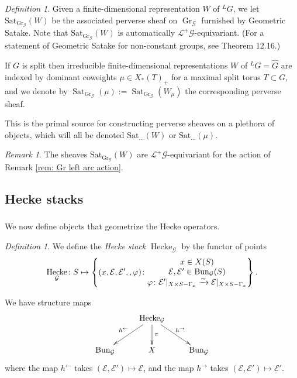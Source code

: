 \documentclass[reqno]{amsart}
\numberwithin{equation}{section}
\newcommand{\wh}[1]{\widehat{#1}}
\newcommand{\Cal}[1]{\mathcal{#1}}
\newcommand{\co}{\colon}
\newcommand{\mrm}[1]{\mathrm{#1}}
\DeclareMathOperator{\Bun}{Bun}
\DeclareMathOperator{\Gr}{Gr}
\DeclareMathOperator{\Hecke}{Hecke}
\DeclareMathOperator{\Sat}{Sat}
\theoremstyle{remark}
\newtheorem{remark}[thm]{Remark}
\newtheorem{defn}[thm]{Definition}
\numberwithin{equation}{section}
\begin{document}
\begin{defn}
Given a finite-dimensional representation $W$ of ${}^L G$, we let $\mrm{Sat}_{\Gr_{\Cal{G}}}(W)$ be the associated perverse sheaf on $\Gr_{\Cal{G}}$ furnished by Geometric Satake. Note that $\mrm{Sat}_{\Gr_{\Cal{G}}}(W)$ is automatically $\Cal{L}^+ \Cal{G}$-equivariant. (For a statement of Geometric Satake for non-constant groups, see \cite{Laff12} Theorem 12.16.) 

If $G$ is split then irreducible finite-dimensional representations $W$ of ${}^L  G   = \wh{G}$ are indexed by dominant coweights $\mu \in  X_*(T)_+$ for a maximal split torus $T \subset G$, and we denote by $\Sat_{\Gr_{\Cal{G}}}(\mu) := \Sat_{\Gr_{\Cal{G}}}(W_{\mu})$ the corresponding perverse sheaf.
\end{defn}

This is the primal source for constructing perverse sheaves on a plethora of objects, which will all be denoted $\mrm{Sat}_{\ldots}(W)$ or $\mrm{Sat}_{\ldots}(\mu)$. 

\begin{remark}
The sheaves $\mrm{Sat}_{\Gr_{\Cal{G}}}(W)$ are $\Cal{L}^+ \Cal{G}$-equivariant for the action of Remark \ref{rem: Gr left arc action}. 
\end{remark}

\subsection{Hecke stacks} 

\subsubsection{} We now define objects that geometrize the Hecke operators. 

\begin{defn}
We define the \emph{Hecke stack} $\Hecke_{\Cal{G}}$ by the functor of points 
\[
\Hecke_{\Cal{G}} \co S \mapsto \left\{ (x, \Cal{E}, \Cal{E}',  , \varphi) \colon  \begin{array}{@{}c@{}} 
x \in X(S) \\
  \Cal{E}, \Cal{E}' \in \Bun_{\Cal{G}}(S)  \\
\varphi \colon \Cal{E}'|_{X \times S - \Gamma_{x}} \xrightarrow{\sim} \Cal{E}|_{X \times S - \Gamma_{x}}
 \end{array} \right\}  .
\]


\end{defn}


We have structure maps 
\[
\xymatrix{
& \Hecke_{\Cal{G}} \ar[dl]_{h^{\leftarrow}} \ar[dr]^{h^{\rightarrow}} \ar[d]^{\pi} \\
\Bun_{\Cal{G}} & X & \Bun_{\Cal{G}}
}
\]
where the map $h^{\leftarrow}$ takes $(\Cal{E}, \Cal{E}') \mapsto \Cal{E}$, and the map $h^{\rightarrow}$ takes $(\Cal{E}, \Cal{E}') \mapsto \Cal{E}'$. 
\end{document}
